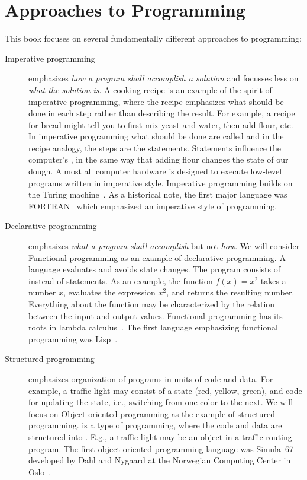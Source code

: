 \section{Approaches to Programming}
This book focuses on several fundamentally different approaches to programming: 
\begin{description}
\item[Imperative programming] emphasizes \emph{how a program shall accomplish a solution} and focusses less on \emph{what the solution is}. A cooking recipe is an example of the spirit of imperative programming, where the recipe emphasizes what should be done in each step rather than describing the result. For example, a recipe for bread might tell you to first mix yeast and water, then add flour, etc. In imperative programming what should be done are called  and in the recipe analogy, the steps are the statements. Statements influence the computer's , in the same way that adding flour changes the state of our dough. Almost all computer hardware is designed to execute low-level programs written in imperative style. Imperative programming builds on the Turing machine~\cite{turing36}. As a historical note, the first major language was FORTRAN~\cite{backus54} which emphasized an imperative style of programming.
\item[Declarative programming] emphasizes \emph{what a program shall accomplish} but not \emph{how}. We will consider Functional programming as an example of declarative programming. A  language evaluates  and avoids state changes. The program consists of  instead of statements. As an example, the function $f(x) = x^2$ takes a number $x$, evaluates the expression $x^2$, and returns the resulting number. Everything about the function may be characterized by the relation between the input and output values.  Functional programming has its roots in lambda calculus~\cite{church36}. The first language emphasizing functional programming was Lisp~\cite{mccarthy60}. 
\item[Structured programming] emphasizes organization of programs in units of code and data. For example, a traffic light may consist of a state (red, yellow, green), and code for updating the state, i.e., switching from one color to the next. We will focus on Object-oriented programming as the example of structured programming.  is a type of programming, where the code and data are structured into . E.g., a traffic light may be an object in a traffic-routing program. The first object-oriented programming language was Simula~67 developed by Dahl and Nygaard at the Norwegian Computing Center in Oslo~\cite{dahl.nygaard67}.

\end{description}
